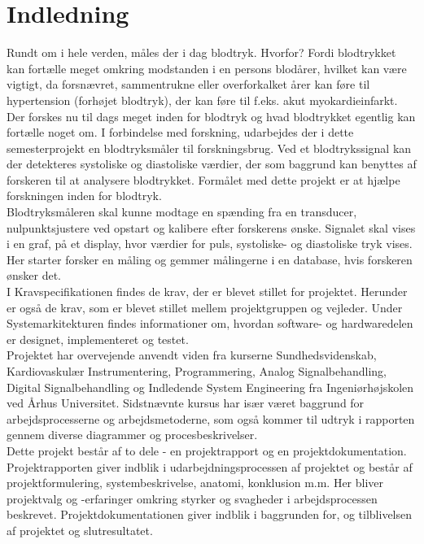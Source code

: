 \chapter{Indledning} 
Rundt om i hele verden, måles der i dag blodtryk. Hvorfor? Fordi blodtrykket kan fortælle meget omkring modstanden i en persons blodårer, hvilket kan være vigtigt, da forsnævret, sammentrukne eller overforkalket årer kan føre til hypertension (forhøjet blodtryk), der kan føre til f.eks. akut myokardieinfarkt. Der forskes nu til dags meget inden for blodtryk og hvad blodtrykket egentlig kan fortælle noget om. I forbindelse med forskning, udarbejdes der i dette semesterprojekt en blodtryksmåler til forskningsbrug. Ved et blodtrykssignal kan der detekteres systoliske og diastoliske værdier, der som baggrund kan benyttes af forskeren til at analysere blodtrykket. Formålet med dette projekt er at hjælpe forskningen inden for blodtryk. \\
Blodtryksmåleren skal kunne modtage en spænding fra en transducer, nulpunktsjustere ved opstart og kalibere efter forskerens ønske. Signalet skal vises i en graf, på et display, hvor værdier for puls, systoliske- og diastoliske tryk vises. Her starter forsker en måling og gemmer målingerne i en database, hvis forskeren ønsker det. \\
I Kravspecifikationen findes de krav, der er blevet stillet for projektet. Herunder er også de krav, som er blevet stillet mellem projektgruppen og vejleder. Under Systemarkitekturen findes informationer om, hvordan software- og hardwaredelen er designet, implementeret og testet. \\
Projektet har overvejende anvendt viden fra kurserne Sundhedsvidenskab, Kardiovaskulær Instrumentering, Programmering, Analog Signalbehandling, Digital Signalbehandling og Indledende System Engineering fra Ingeniørhøjskolen ved Århus Universitet. Sidstnævnte kursus har især været baggrund for arbejdsprocesserne og arbejdsmetoderne, som også kommer til udtryk i rapporten gennem diverse diagrammer og procesbeskrivelser. \\
Dette projekt består af to dele - en projektrapport og en projektdokumentation. Projektrapporten giver indblik i udarbejdningsprocessen af projektet og består af projektformulering, systembeskrivelse, anatomi, konklusion m.m. Her bliver projektvalg og -erfaringer omkring styrker og svagheder i arbejdsprocessen beskrevet. Projektdokumentationen giver indblik i baggrunden for, og tilblivelsen af projektet og slutresultatet. \\

